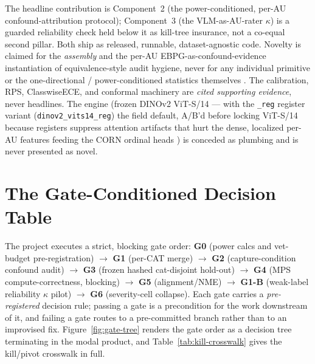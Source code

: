 The headline contribution is Component~2 (the power-conditioned, per-AU
confound-attribution protocol); Component~3 (the VLM-as-AU-rater $\kappa$) is a
guarded reliability check held below it as kill-tree insurance, not a co-equal
second pillar. Both ship as released, runnable, dataset-agnostic code. Novelty is
claimed for the \emph{assembly} and the per-AU EBPG-as-confound-evidence
instantiation of equivalence-style audit hygiene, never for any individual primitive
or the one-directional / power-conditioned statistics themselves
\citep{huanghooker2026fairness,singh2023samplesize}. The calibration, RPS,
ClasswiseECE, and conformal machinery are \emph{cited supporting evidence}, never
headlines. The engine (frozen DINOv2 ViT-S/14 --- with the \texttt{\_reg}
register variant (\texttt{dinov2\_vits14\_reg}) the field default, A/B'd before
locking ViT-S/14 because registers suppress attention artifacts that hurt the
dense, localized per-AU features
\citep{oquab2023dinov2} feeding the CORN ordinal heads \citep{shi2023corn}) is
conceded as plumbing and is never presented as novel.

\section{The Gate-Conditioned Decision Table}
\label{sec:decision-table}

The project executes a strict, blocking gate order: \textbf{G0}
(power calcs and vet-budget pre-registration) $\to$ \textbf{G1} (per-CAT merge)
$\to$ \textbf{G2} (capture-condition confound audit) $\to$ \textbf{G3} (frozen
hashed cat-disjoint hold-out) $\to$ \textbf{G4} (MPS compute-correctness, blocking)
$\to$ \textbf{G5} (alignment/NME) $\to$ \textbf{G1-B} (weak-label reliability
$\kappa$ pilot) $\to$ \textbf{G6} (severity-cell collapse). Each gate carries a
\emph{pre-registered} decision rule; passing a gate is a precondition for the work
downstream of it, and failing a gate routes to a pre-committed branch rather than
to an improvised fix. Figure~\ref{fig:gate-tree} renders the gate order as a
decision tree terminating in the modal product, and Table~\ref{tab:kill-crosswalk}
gives the kill/pivot crosswalk in full.


